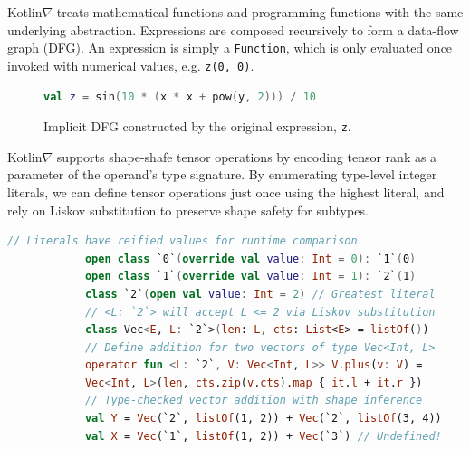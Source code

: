 \documentclass[12pt,initial,twoside,maitrise]{dms}
\numberwithin{equation}{section}
\numberwithin{table}{chapter}
\numberwithin{figure}{chapter}
\begin{document}
Kotlin$\nabla$ treats mathematical functions and programming functions with the same underlying abstraction. Expressions are composed recursively to form a data-flow graph (DFG). An expression is simply a \texttt{Function}, which is only evaluated once invoked with numerical values, e.g. \texttt{z(0, 0)}.

\begin{figure}[!htb]
    \begin{lstlisting}[caption={Simple code listing.}, language=Kotlin]
        val z = sin(10 * (x * x + pow(y, 2))) / 10
    \end{lstlisting}
    \centering
    \caption{Implicit DFG constructed by the original expression, \texttt{z}.}
\end{figure}

Kotlin$\nabla$ supports shape-shafe tensor operations by encoding tensor rank as a parameter of the operand's type signature. By enumerating type-level integer literals, we can define tensor operations just once using the highest literal, and rely on Liskov substitution to preserve shape safety for subtypes.

\begin{lstlisting}[caption={Shape safe tensor addition for rank-1 tensors, $\forall L\leq2.$}, language=Kotlin]
            // Literals have reified values for runtime comparison
            open class `0`(override val value: Int = 0): `1`(0)
            open class `1`(override val value: Int = 1): `2`(1)
            class `2`(open val value: Int = 2) // Greatest literal
            // <L: `2`> will accept L <= 2 via Liskov substitution
            class Vec<E, L: `2`>(len: L, cts: List<E> = listOf())
            // Define addition for two vectors of type Vec<Int, L>
            operator fun <L: `2`, V: Vec<Int, L>> V.plus(v: V) =
            Vec<Int, L>(len, cts.zip(v.cts).map { it.l + it.r })
            // Type-checked vector addition with shape inference
            val Y = Vec(`2`, listOf(1, 2)) + Vec(`2`, listOf(3, 4))
            val X = Vec(`1`, listOf(1, 2)) + Vec(`3`) // Undefined!
\end{lstlisting}
\end{document}

